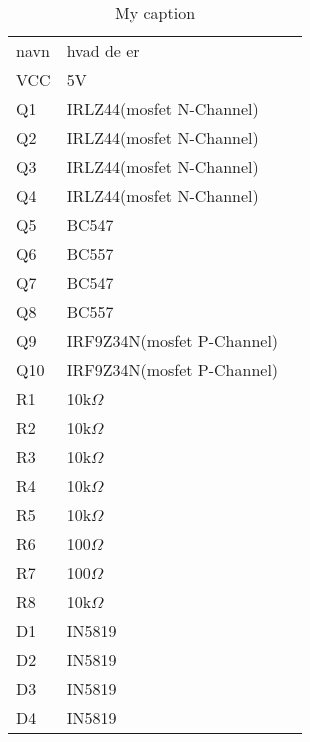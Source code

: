 \begin{table}[]
	\centering
	\caption{My caption}
	\label{my-label}
	\begin{tabular}{|l|l|l}
		\cline{1-2}
		navn & hvad de er                 &  \\ \cline{1-2}
		VCC  & 5V                         &  \\ \cline{1-2}
		Q1   & IRLZ44(mosfet N-Channel)   &  \\ \cline{1-2}
		Q2   & IRLZ44(mosfet N-Channel)   &  \\ \cline{1-2}
		Q3   & IRLZ44(mosfet N-Channel)   &  \\ \cline{1-2}
		Q4   & IRLZ44(mosfet N-Channel)   &  \\ \cline{1-2}
		Q5   & BC547                      &  \\ \cline{1-2}
		Q6   & BC557                      &  \\ \cline{1-2}
		Q7   & BC547                      &  \\ \cline{1-2}
		Q8   & BC557                      &  \\ \cline{1-2}
		Q9   & IRF9Z34N(mosfet P-Channel) &  \\ \cline{1-2}
		Q10  & IRF9Z34N(mosfet P-Channel) &  \\ \cline{1-2}
		R1   & 10k$\Omega$                &  \\ \cline{1-2}
		R2   & 10k$\Omega$                &  \\ \cline{1-2}
		R3   & 10k$\Omega$                &  \\ \cline{1-2}
		R4   & 10k$\Omega$                &  \\ \cline{1-2}
		R5   & 10k$\Omega$                &  \\ \cline{1-2}
		R6   & 100$\Omega$                &  \\ \cline{1-2}
		R7   & 100$\Omega$                &  \\ \cline{1-2}
		R8   & 10k$\Omega$                &  \\ \cline{1-2}
		D1   & IN5819                     &  \\ \cline{1-2}
		D2   & IN5819                     &  \\ \cline{1-2}
		D3   & IN5819                     &  \\ \cline{1-2}
		D4   & IN5819                     &  \\ \cline{1-2}
	\end{tabular}
\end{table}

